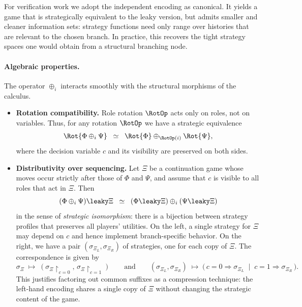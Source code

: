For verification work we adopt the independent encoding as canonical.
It yields a game that is strategically equivalent to the leaky version, but admits smaller and cleaner information sets: strategy functions need only range over histories that are relevant to the chosen branch.
In practice, this recovers the tight strategy spaces one would obtain from a structural branching node.

\paragraph{Algebraic properties.}
The operator $\oplus_i$ interacts smoothly with the structural morphisms of the calculus.

\begin{itemize}
  \item \textbf{Rotation compatibility.}
        Role rotation $\RotOp$ acts only on roles, not on variables.
        Thus, for any rotation $\RotOp$ we have a strategic equivalence
        \[
          \Rot{\Phi \oplus_i \Psi}
          \;\;\simeq\;\;
          \Rot{\Phi} \oplus_{\RotOp(i)} \Rot{\Psi},
        \]
        where the decision variable $c$ and its visibility are preserved on both sides.

  \item \textbf{Distributivity over sequencing.}
        Let $\Xi$ be a continuation game whose moves occur strictly after those of $\Phi$ and $\Psi$, and assume that $c$ is visible to all roles that act in $\Xi$.
        Then
        \[
          (\Phi \oplus_i \Psi) \leaky \Xi
          \;\;\simeq\;\;
          (\Phi \leaky \Xi) \oplus_i (\Psi \leaky \Xi)
        \]
        in the sense of \emph{strategic isomorphism}: there is a bijection between strategy profiles that preserves all players’ utilities.
        On the left, a single strategy for $\Xi$ may depend on $c$ and hence implement branch-specific behavior.
        On the right, we have a pair $(\sigma_{\Xi_L}, \sigma_{\Xi_R})$ of strategies, one for each copy of $\Xi$.
        The correspondence is given by
        \[
          \sigma_\Xi \;\mapsto\; (\sigma_\Xi \!\restriction_{c=0},\, \sigma_\Xi \!\restriction_{c=1})
          \qquad\text{and}\qquad
          (\sigma_{\Xi_L},\sigma_{\Xi_R}) \;\mapsto\;
          \bigl(\,c=0 \Rightarrow \sigma_{\Xi_L} \;\mid\; c=1 \Rightarrow \sigma_{\Xi_R}\,\bigr).
        \]
        This justifies factoring out common suffixes as a compression technique:
        the left-hand encoding shares a single copy of $\Xi$ without changing the strategic content of the game.
\end{itemize}

